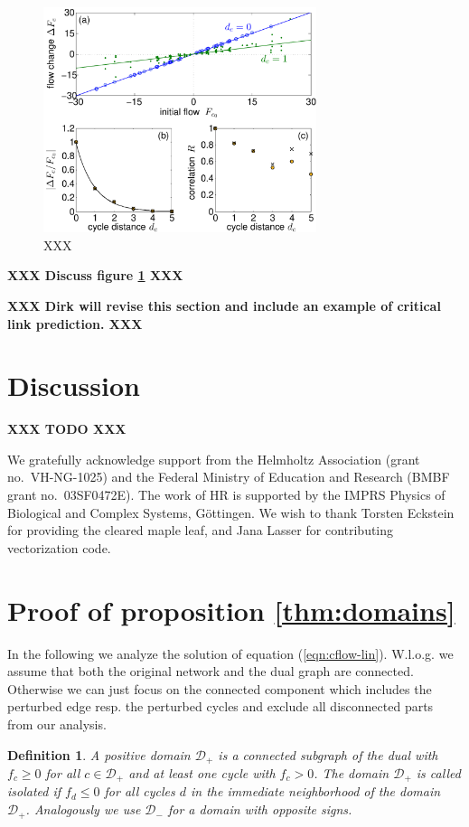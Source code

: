 \documentclass[10pt,aps,pra,twocolumn,superscriptaddress]{revtex4-1}
\newcommand{\DD}{\mathcal{D}}
\newtheorem{defn}[thm]{Definition}
\begin{document}
\begin{figure}[tb]
\includegraphics[width=8cm]{pics/case30d_fchange_quant2.pdf}
\caption{
\label{fig:case30q}
XXX
}
\end{figure}

\textbf{XXX Discuss figure \ref{fig:case30q} XXX}

\textbf{XXX Dirk will revise this section and include an example of critical link prediction. XXX}

\section{Discussion}

\textbf{XXX TODO XXX}

\acknowledgments
 
We gratefully acknowledge support from the Helmholtz
Association (grant no.~VH-NG-1025) and the Federal Ministry of 
Education and Research (BMBF grant no.~03SF0472E).
The work of HR is supported by the IMPRS Physics of Biological and
Complex Systems, G\"ottingen. We wish to thank Torsten Eckstein for 
providing the cleared maple leaf, and Jana Lasser for 
contributing vectorization code.
\appendix

\section{Proof of proposition \ref{thm:domains}}
\label{sec:proof1}

In the following we analyze the solution of equation (\ref{eqn:cflow-lin}). W.l.o.g.  we 
assume that both the original network and the dual graph are connected. Otherwise we
can just focus on the connected component which includes the perturbed edge resp. the
perturbed cycles and exclude all disconnected parts from our analysis.

\begin{defn}
A positive domain $\DD_+$ is a connected subgraph of the dual with $f_c \ge 0$ 
for all $c \in \DD_+$ and at least one cycle with $f_c >0$. The domain $\DD_+$ is called 
isolated if $f_d \le 0$ for all cycles $d$ in the immediate neighborhood of the domain $\DD_+$. 
Analogously we use $\DD_-$ for a domain with opposite signs. 
\end{defn}
\end{document}
